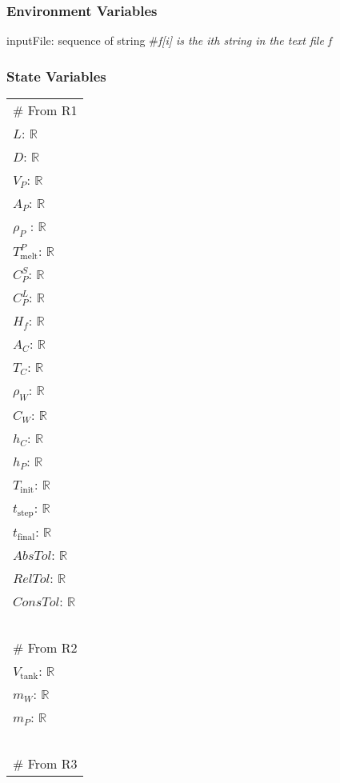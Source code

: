 \documentclass[12pt]{article}
\begin{document}
\subsubsection{Environment Variables}

inputFile: sequence of string \#\textit{f[i] is the ith string in the text file f}\\ 

\subsubsection{State Variables}

\renewcommand{\arraystretch}{1.2}
\begin{longtable*}[l]{l} 
\# From R1\\
$L$: $\mathbb{R}$ \\
$D$: $\mathbb{R}$ \\
$V_P$: $\mathbb{R}$ \\
$A_P$: $\mathbb{R}$ \\
$\rho_P$ : $\mathbb{R}$ \\
$T_\text{melt}^{P}$: $\mathbb{R}$ \\
$C^S_P$: $\mathbb{R}$ \\
$C^L_P$: $\mathbb{R}$ \\
$H_f$: $\mathbb{R}$ \\
$A_C$: $\mathbb{R}$ \\
$T_C$: $\mathbb{R}$ \\
$\rho_W$: $\mathbb{R}$ \\
$C_W$: $\mathbb{R}$ \\
$h_C$: $\mathbb{R}$ \\
$h_P$: $\mathbb{R}$ \\
$T_\text{init}$: $\mathbb{R}$ \\
$t_\text{step}$: $\mathbb{R}$ \\
$t_\text{final}$: $\mathbb{R}$ \\
$\mathit{AbsTol}$: $\mathbb{R}$ \\
$\mathit{RelTol}$: $\mathbb{R}$ \\
$\mathit{ConsTol}$: $\mathbb{R}$ \\
~\\
\# From R2\\
$V_\text{tank}$: $\mathbb{R}$ \\
$m_W$: $\mathbb{R}$ \\
$m_P$: $\mathbb{R}$ \\
~\\
\noindent \# From R3\\

\end{longtable*}
\end{document}
